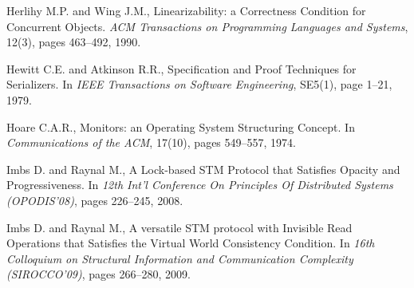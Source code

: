 \begin{thebibliography}{99}
{%



Herlihy M.P.  and Wing J.M.,
Linearizability: a Correctness Condition for Concurrent Objects. 
{\it ACM Transactions on Programming Languages and Systems}, 
12(3), pages 463--492, 1990. 

% 
% 
% 









 


Hewitt C.E. and Atkinson R.R., 
Specification and Proof Techniques for Serializers. 
In {\it IEEE Transactions on Software Engineering}, SE5(1), page 1--21, 1979. 



Hoare C.A.R., 
Monitors: an Operating System Structuring Concept. 
In {\it Communications of the  ACM}, 17(10), pages 549--557, 1974. 




Imbs D. and Raynal M.,
A Lock-based STM Protocol  that Satisfies Opacity and Progressiveness. 
In {\it 12th Int'l Conference On Principles Of Distributed Systems
(OPODIS'08)},  pages 226--245, 2008.


Imbs D. and Raynal M., 
A versatile   STM protocol with Invisible Read Operations
that Satisfies  the  Virtual World Consistency Condition.
In {\it  16th  Colloquium   on  Structural   Information   and  Communication
Complexity  (SIROCCO'09)}, pages 266--280, 2009.



}
\end{thebibliography}

